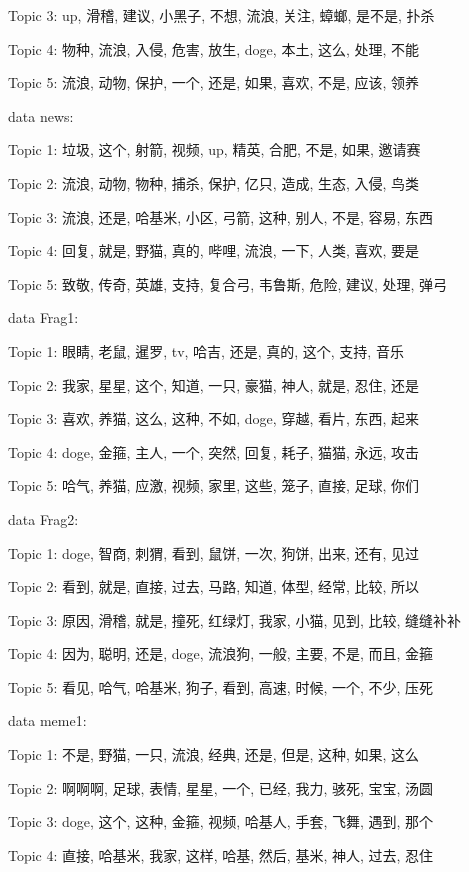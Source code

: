 \documentclass[12pt,a4paper]{ctexart}
\theoremstyle{MyLineTheoremStyle}
\theoremstyle{MyBlockTheoremStyle}
\theoremstyle{MySubsubsectionStyle}
\begin{document}
Topic 3: up, 滑稽, 建议, 小黑子, 不想, 流浪, 关注, 蟑螂, 是不是, 扑杀

Topic 4: 物种, 流浪, 入侵, 危害, 放生, doge, 本土, 这么, 处理, 不能

Topic 5: 流浪, 动物, 保护, 一个, 还是, 如果, 喜欢, 不是, 应该, 领养

data news:

Topic 1: 垃圾, 这个, 射箭, 视频, up, 精英, 合肥, 不是, 如果, 邀请赛

Topic 2: 流浪, 动物, 物种, 捕杀, 保护, 亿只, 造成, 生态, 入侵, 鸟类

Topic 3: 流浪, 还是, 哈基米, 小区, 弓箭, 这种, 别人, 不是, 容易, 东西

Topic 4: 回复, 就是, 野猫, 真的, 哔哩, 流浪, 一下, 人类, 喜欢, 要是

Topic 5: 致敬, 传奇, 英雄, 支持, 复合弓, 韦鲁斯, 危险, 建议, 处理, 弹弓

data Frag1:

Topic 1: 眼睛, 老鼠, 暹罗, tv, 哈吉, 还是, 真的, 这个, 支持, 音乐

Topic 2: 我家, 星星, 这个, 知道, 一只, 豪猫, 神人, 就是, 忍住, 还是

Topic 3: 喜欢, 养猫, 这么, 这种, 不如, doge, 穿越, 看片, 东西, 起来

Topic 4: doge, 金箍, 主人, 一个, 突然, 回复, 耗子, 猫猫, 永远, 攻击

Topic 5: 哈气, 养猫, 应激, 视频, 家里, 这些, 笼子, 直接, 足球, 你们

data Frag2:

Topic 1: doge, 智商, 刺猬, 看到, 鼠饼, 一次, 狗饼, 出来, 还有, 见过

Topic 2: 看到, 就是, 直接, 过去, 马路, 知道, 体型, 经常, 比较, 所以

Topic 3: 原因, 滑稽, 就是, 撞死, 红绿灯, 我家, 小猫, 见到, 比较, 缝缝补补

Topic 4: 因为, 聪明, 还是, doge, 流浪狗, 一般, 主要, 不是, 而且, 金箍

Topic 5: 看见, 哈气, 哈基米, 狗子, 看到, 高速, 时候, 一个, 不少, 压死

data meme1:

Topic 1: 不是, 野猫, 一只, 流浪, 经典, 还是, 但是, 这种, 如果, 这么

Topic 2: 啊啊啊, 足球, 表情, 星星, 一个, 已经, 我力, 骇死, 宝宝, 汤圆

Topic 3: doge, 这个, 这种, 金箍, 视频, 哈基人, 手套, 飞舞, 遇到, 那个

Topic 4: 直接, 哈基米, 我家, 这样, 哈基, 然后, 基米, 神人, 过去, 忍住
\end{document}
